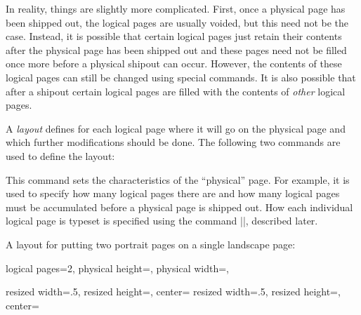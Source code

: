 In reality, things are slightly more complicated. First, once a
physical page has been shipped out, the logical pages are usually
voided, but this need not be the case. Instead, it is possible that
certain logical pages just retain their contents after the physical
page has been shipped out and these pages need not be filled once more
before a physical shipout can occur. However, the contents of these
logical pages can still be changed using special commands. It is also
possible that after a shipout certain logical pages are filled with
the contents of \emph{other} logical pages.

A \emph{layout} defines for each logical page where it will go on the
physical page and which further modifications should be done. The
following two commands are used to define the layout:

\begin{command}{\pgfpagesphysicalpageoptions{}}
  This command sets the characteristics of the ``physical'' page. For
  example, it is used to specify how many logical pages there are and
  how many logical pages must be accumulated before a physical page is
  shipped out. How each individual logical page is typeset is
  specified using the command |\pgfpageslogicalpageoptions|, described
  later.

  \example A layout for putting two portrait pages on a single
  landscape page:
\begin{codeexample}
\pgfpagesphysicalpageoptions
{%
  logical pages=2,%
  physical height=\paperwidth,%
  physical width=\paperheight,%
}

{%
  resized width=.5\pgfphysicalwidth,%
  resized height=\pgfphysicalheight,%
  center=\pgfpoint{.25\pgfphysicalwidth}{.5\pgfphysicalheight}%
}%
{%
  resized width=.5\pgfphysicalwidth,%
  resized height=\pgfphysicalheight,%
  center=\pgfpoint{.75\pgfphysicalwidth}{.5\pgfphysicalheight}%
}%
\end{codeexample}


\end{command}
